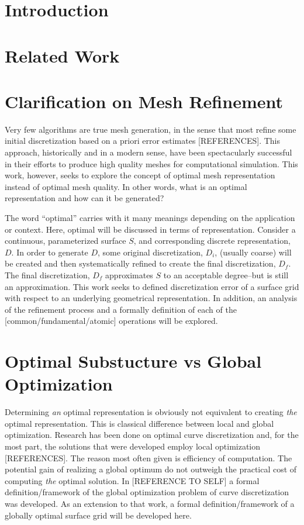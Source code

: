 \documentclass[11pt]{article}
\begin{document}
\section{Introduction}
\section{Related Work}
\section{Clarification on Mesh Refinement}
Very few algorithms are true mesh generation, in the sense that most refine some initial discretization based on a priori error estimates [REFERENCES]. This approach, historically and in a modern sense, have been spectacularly successful in their efforts to produce high quality meshes for computational simulation. This work, however, seeks to explore the concept of optimal mesh representation instead of optimal mesh quality. In other words, what is an optimal representation and how can it be generated?

The word ``optimal'' carries with it many meanings depending on the application or context. Here, optimal will be discussed in terms of representation. Consider a continuous, parameterized surface $S$, and corresponding discrete representation, $D$. In order to generate $D$, some original discretization, $D_i$, (usually coarse) will be created and then systematically refined to create the final discretization, $D_f$. The final discretization, $D_f$ approximates $S$ to an acceptable degree--but is still an approximation. This work seeks to defined discretization error of a surface grid with respect to an underlying geometrical representation. In addition, an analysis of the refinement process and a formally definition of each of the [common/fundamental/atomic] operations will be explored.

\section{Optimal Substucture vs Global Optimization}
Determining {\it an} optimal representation is obviously not equivalent to creating {\it the} optimal representation. This is classical difference between local and global optimization. Research has been done on optimal curve discretization and, for the most part, the solutions that were developed employ local optimization [REFERENCES]. The reason most often given is efficiency of computation. The potential gain of realizing a global optimum do not outweigh the practical cost of computing {\it the} optimal solution. In [REFERENCE TO SELF] a formal definition/framework of the global optimization problem of curve discretization was developed. As an extension to that work, a formal definition/framework of a globally optimal surface grid will be developed here.
\end{document}
